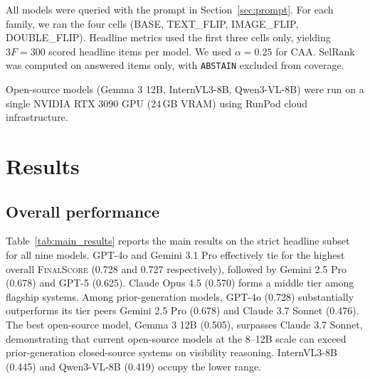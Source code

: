 \documentclass[11pt]{article}
\begin{document}
All models were queried with the prompt in Section~\ref{sec:prompt}. For each family, we ran the four cells (BASE, TEXT\_FLIP, IMAGE\_FLIP, DOUBLE\_FLIP). Headline metrics used the first three cells only, yielding \(3F=300\) scored headline items per model. We used \(\alpha=0.25\) for CAA. SelRank was computed on answered items only, with \texttt{ABSTAIN} excluded from coverage.

Open-source models (Gemma 3 12B, InternVL3-8B, Qwen3-VL-8B) were run on a single NVIDIA RTX 3090 GPU (24\,GB VRAM) using RunPod cloud infrastructure.

\begin{table}[t]
\centering
\small
{}
\caption*{} %
\end{table}

\section{Results}
\label{sec:results}

\subsection{Overall performance}

Table~\ref{tab:main_results} reports the main results on the strict headline subset for all nine models. GPT-4o and Gemini 3.1 Pro effectively tie for the highest overall \textsc{FinalScore} (0.728 and 0.727 respectively), followed by Gemini 2.5 Pro (0.678) and GPT-5 (0.625). Claude Opus 4.5 (0.570) forms a middle tier among flagship systems. Among prior-generation models, GPT-4o (0.728) substantially outperforms its tier peers Gemini 2.5 Pro (0.678) and Claude 3.7 Sonnet (0.476). The best open-source model, Gemma 3 12B (0.505), surpasses Claude 3.7 Sonnet, demonstrating that current open-source models at the 8--12B scale can exceed prior-generation closed-source systems on visibility reasoning. InternVL3-8B (0.445) and Qwen3-VL-8B (0.419) occupy the lower range.
\end{document}
